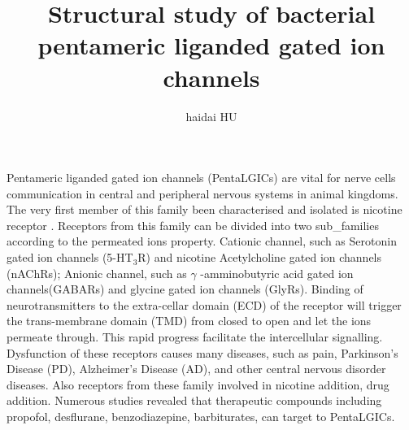 \documentclass[12pt,a4paper,]{article}
\author{haidai HU}
\title{Structural study of bacterial pentameric liganded gated ion channels}
\begin{document}
	\maketitle
	Pentameric liganded gated ion channels (PentaLGICs) are vital for nerve cells communication in central and peripheral nervous systems  in  animal kingdoms. The very first member of this family been characterised and isolated is nicotine receptor \cite{changeux1970use}. Receptors from this family can be divided into two sub\_families according to the permeated ions property. Cationic channel, such as Serotonin gated ion channels (5-HT$_3$R) and  nicotine Acetylcholine gated ion channels (nAChRs); Anionic channel, such as  $\gamma$ -amminobutyric acid gated ion channels(GABARs) and glycine gated ion channels (GlyRs). Binding of neurotransmitters  to the extra-cellar domain (ECD) of the receptor will trigger the trans-membrane domain (TMD) from closed to open and let the ions permeate through. This rapid progress facilitate the intercellular signalling.  Dysfunction of these receptors causes many diseases, such as 
	pain, Parkinson's Disease (PD), Alzheimer's Disease (AD), and other central nervous disorder diseases. Also receptors from these family involved in nicotine addition, drug addition. Numerous studies revealed that therapeutic compounds including propofol, desflurane, benzodiazepine, barbiturates, can target to PentaLGICs.\\ 
	
	
	
	
	
	
	
\end{document}
